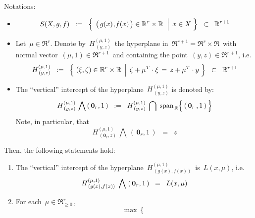 \vskip 1.0cm
\begin{lemma}
\mbox{}
\vskip 0.1cm
\noindent
Notations:
\begin{itemize}
\item
	\begin{equation*}
	S(X,g,f)
	\;\; := \;\;
		\left\{\;\left.
			\left(\,g(x)\overset{{\color{white}1}}{,}f(x)\,\right) \in \Re^{r} \overset{{\color{white}.}}{\times} \Re
			\;\;\right\vert\;
				x \in X
			\;\right\}
	\;\; \subset \;\;
		\Re^{r+1}
	\end{equation*}
\item
	Let \,$\mu \in \Re^{r}$.
	Denote by \,$H^{(\mu,1)}_{\,(y,z)}$\, the hyperplane in \,$\Re^{r+1} = \Re^{r} \times \Re$\,
	with normal vector \,$(\mu,1) \in \Re^{r+1}$\, and containing the point \,$(y,z) \in \Re^{r+1}$, i.e.
	\begin{equation*}
	H^{(\mu,1)}_{\,(y,z)}
	\;\; := \;\;
		\left\{\,\left.
			(\xi,\zeta) \in \Re^{r}\times\overset{{\color{white}.}}{\Re}
			\,\;\right\vert\;
			\zeta + \mu^{T} \cdot \xi \,=\,  z + \mu^{T} \cdot y
			\;\right\}
	\;\; \subset \;\;
		\Re^{r+1}
	\end{equation*}
\item
	The ``vertical'' intercept of the hyperplane \,$H^{(\mu,1)}_{\,(y,z)}$ is denoted by:
	\begin{equation*}
	H^{(\mu,1)}_{\,(y,z)} \,\bigwedge\, (\,\mathbf{0}_{r},1\,)
	\;\; := \;\;
		H^{(\mu,1)}_{\,(y,z)}
			\;\bigcap\;
			\span_{\,\Re}\!\left\{\,\overset{{\color{white}.}}{(\,\mathbf{0}_{r}\,,1\,)}\,\right\}
	\end{equation*}
	Note, in particular, that
	\begin{equation*}
	H^{(\mu,1)}_{\,(\mathbf{0}_{r},z)} \,\bigwedge\, (\,\mathbf{0}_{r},1\,)
	\;\; = \;\;
		z
	\end{equation*}
\end{itemize}
Then, the following statements hold:
\begin{enumerate}
\item
	The ``vertical'' intercept of the hyperplane \,$H^{(\mu,1)}_{\,(g(x),f(x))}$\, is \,$L(x,\mu)$, i.e.
	\begin{equation*}
	H^{(\mu,1)}_{\,(g(x),f(x))} \;\bigwedge\; (\,\mathbf{0}_{r},1\,)
	\;\; = \;\;
		\overset{{\color{white}.}}{L}(x,\mu)
	\end{equation*}
\item
	For each \,$\mu \in \Re_{\geq 0}^{r}$\,,
	\begin{equation*}
	\max\left\{\;

\end{equation*}
\end{enumerate}
\end{lemma}
